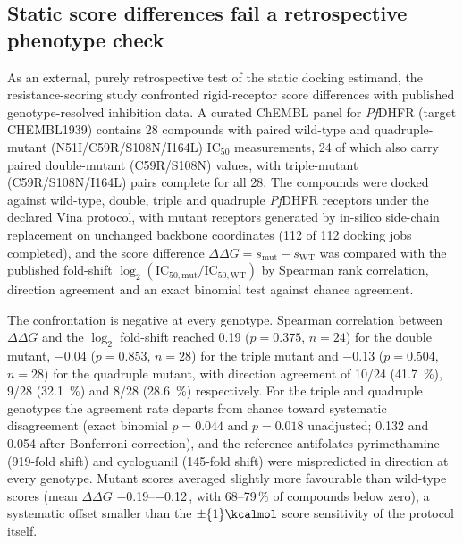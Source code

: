 \subsection{Static score differences fail a retrospective phenotype check}

As an external, purely retrospective test of the static docking estimand, the resistance-scoring study confronted rigid-receptor score differences with published genotype-resolved inhibition data. A curated ChEMBL panel for \emph{Pf}DHFR (target CHEMBL1939) contains \num{28} compounds with paired wild-type and quadruple-mutant (N51I/C59R/S108N/I164L) IC$_{50}$ measurements, \num{24} of which also carry paired double-mutant (C59R/S108N) values, with triple-mutant (C59R/S108N/I164L) pairs complete for all \num{28}. The compounds were docked against wild-type, double, triple and quadruple \emph{Pf}DHFR receptors under the declared Vina protocol, with mutant receptors generated by in-silico side-chain replacement on unchanged backbone coordinates (\num{112} of \num{112} docking jobs completed), and the score difference $\Delta\Delta G = s_{\mathrm{mut}} - s_{\mathrm{WT}}$ was compared with the published fold-shift $\log_2(\mathrm{IC}_{50,\mathrm{mut}}/\mathrm{IC}_{50,\mathrm{WT}})$ by Spearman rank correlation, direction agreement and an exact binomial test against chance agreement.

The confrontation is negative at every genotype. Spearman correlation between $\Delta\Delta G$ and the $\log_2$ fold-shift reached \num{0.19} ($p = \num{0.375}$, $n = \num{24}$) for the double mutant, $-\num{0.04}$ ($p = \num{0.853}$, $n = \num{28}$) for the triple mutant and $-\num{0.13}$ ($p = \num{0.504}$, $n = \num{28}$) for the quadruple mutant, with direction agreement of \num{10}/\num{24} (\qty{41.7}{\percent}), \num{9}/\num{28} (\qty{32.1}{\percent}) and \num{8}/\num{28} (\qty{28.6}{\percent}) respectively. For the triple and quadruple genotypes the agreement rate departs from chance toward systematic disagreement (exact binomial $p = \num{0.044}$ and $p = \num{0.018}$ unadjusted; \num{0.132} and \num{0.054} after Bonferroni correction), and the reference antifolates pyrimethamine (\num{919}-fold shift) and cycloguanil (\num{145}-fold shift) were mispredicted in direction at every genotype. Mutant scores averaged slightly more favourable than wild-type scores (mean $\Delta\Delta G$ \numrange{-0.19}{-0.12}\,\si{\kcalmol}, with \numrange{68}{79}\,\% of compounds below zero), a systematic offset smaller than the $\pm\qty{1}{\kcalmol}$ score sensitivity of the protocol itself.

